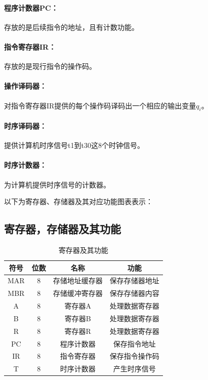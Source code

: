 \documentclass[UTF8]{ctexart}
\begin{document}
    \paragraph{程序计数器PC：} 存放的是后续指令的地址，且有计数功能。

    \paragraph{指令寄存器IR：} 存放的是现行指令的操作码。

    \paragraph{操作译码器：} 对指令寄存器IR提供的每个操作码译码出一个相应的输出变量$q_i$。

    \paragraph{时序译码器：} 提供计算机时序信号t1到t30这8个时钟信号。

    \paragraph{时序计数器：} 为计算机提供时序信号的计数器。

    以下为寄存器、存储器及其对应功能图表表示：

    \subsection{寄存器，存储器及其功能}
    \begin{table}
      \centering
      \begin{tabular}{|c|c|c|c|}
        \hline
        符号 & 位数 & 名称 & 功能 \\
        \hline
        MAR & 8 & 存储地址缓存器 & 保存存储器地址 \\
        MBR & 8 & 存储缓冲寄存器 & 保存存储器内容 \\
        A & 8 & 寄存器A & 处理数据寄存器 \\
        B & 8 & 寄存器B & 处理数据寄存器 \\
        R & 8 & 寄存器R & 处理数据寄存器 \\
        PC & 8 & 程序计数器 & 保存指令地址 \\
        IR & 8 & 指令寄存器 & 保存指令操作码 \\
        T & 8 & 时序计数器 & 产生时序信号 \\
        \hline
      \end{tabular}
      \caption{寄存器及其功能}\label{寄存器及其功能}
    \end{table}
    \newpage
\end{document}
